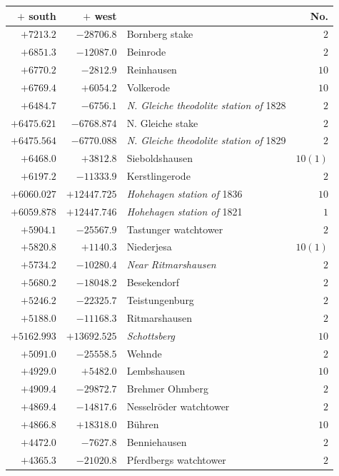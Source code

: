 \clearpage{}%
\begin{center}\begingroup\fontsize{8}{9}\selectfont
\setlength{\tabcolsep}{4pt}
\begin{tabular}{r|r|p{170pt}|r}\hline
\(+\) south&\(+\) west&&No.\\\hline
\(+7213.2\)&\(-28706.8\)&Bornberg stake&\(2\)\\
\(+6851.3\)&\(-12087.0\)&Beinrode&\(2\)\\
\(+6770.2\)&\(-2812.9\)&Reinhausen&\(10\)\\
\(+6769.4\)&\(+6054.2\)&Volkerode&\(10\)\\
\(+6484.7\)&\(-6756.1\)&\textit{N. Gleiche theodolite station of} 1828&\(2\)\\
\(+6475.621\)&\(-6768.874\)&N. Gleiche stake&\(2\)\\
\(+6475.564\)&\(-6770.088\)&\textit{N. Gleiche theodolite station of} 1829&\(2\)\\
\(+6468.0\)&\(+3812.8\)&Sieboldshausen&\(10(1)\)\\
\(+6197.2\)&\(-11333.9\)&Kerstlingerode&\(2\)\\
\(+6060.027\)&\(+12447.725\)&\textit{Hohehagen station of} 1836&\(10\)\\
\(+6059.878\)&\(+12447.746\)&\textit{Hohehagen station of} 1821&\(1\)\\
\(+5904.1\)&\(-25567.9\)&Tastunger watchtower&\(2\)\\
\(+5820.8\)&\(+1140.3\)&Niederjesa&\(10(1)\)\\
\(+5734.2\)&\(-10280.4\)&\textit{Near Ritmarshausen}&\(2\)\\
\(+5680.2\)&\(-18048.2\)&Besekendorf&\(2\)\\
\(+5246.2\)&\(-22325.7\)&Teistungenburg&\(2\)\\
\(+5188.0\)&\(-11168.3\)&Ritmarshausen&\(2\)\\
\(+5162.993\)&\(+13692.525\)&\textit{Schottsberg}&\(10\)\\
\(+5091.0\)&\(-25558.5\)&Wehnde&\(2\)\\
\(+4929.0\)&\(+5482.0\)&Lembshausen&\(10\)\\
\(+4909.4\)&\(-29872.7\)&Brehmer Ohmberg&\(2\)\\
\(+4869.4\)&\(-14817.6\)&Nesselröder watchtower&\(2\)\\
\(+4866.8\)&\(+18318.0\)&Bühren&\(10\)\\
\(+4472.0\)&\(-7627.8\)&Benniehausen&\(2\)\\
\(+4365.3\)&\(-21020.8\)&Pferdbergs watchtower&\(2\)\\

\end{tabular}
\end{center}
